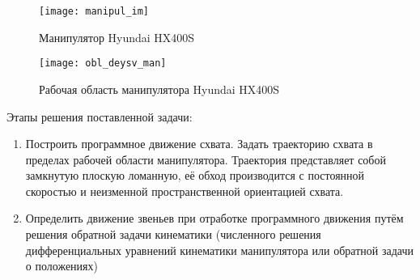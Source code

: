\documentclass[a4paper]{article}
\begin{document}
	\begin{figure}[h]
		\centering
		\texttt{[image: manipul\_im]}
		\caption{Манипулятор Hyundai HX400S}
		\label{fig:mesh1}
	\end{figure}
	\hfill \break
	\begin{figure}[h]
		\centering
		\texttt{[image: obl\_deysv\_man]}
		\caption{Рабочая область манипулятора Hyundai HX400S}
		\label{fig:mesh2}
	\end{figure}
	\hfill \break
	\hfill \break
	\hfill \break
	Этапы решения поставленной задачи:
	\begin{enumerate}
		\item Построить программное движение схвата. Задать траекторию схвата в пределах
		рабочей области манипулятора. Траектория представляет собой замкнутую
		плоскую ломанную, её обход производится с постоянной скоростью и неизменной
		пространственной ориентацией схвата.
		
		\item Определить движение звеньев при отработке программного движения путём
		решения обратной задачи кинематики (численного решения дифференциальных
		уравнений кинематики манипулятора или обратной задачи о положениях)
	\end{enumerate}
	
	
	\newpage
\end{document}
